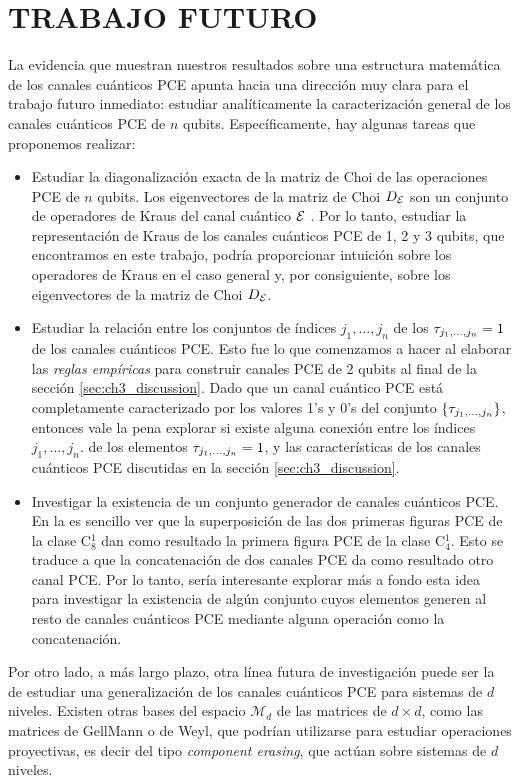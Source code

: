 \chapter{TRABAJO FUTURO}
La evidencia que muestran nuestros resultados sobre una estructura 
matemática de los canales cuánticos PCE apunta hacia una dirección 
muy clara para el trabajo futuro inmediato: estudiar analíticamente la caracterización 
general de los canales cuánticos PCE de $n$ qubits. Específicamente, hay algunas 
tareas que proponemos realizar:
\begin{itemize}
\item Estudiar la diagonalización exacta de la matriz de Choi de las operaciones 
PCE de $n$ qubits. Los eigenvectores de la matriz de Choi $D_{\mathcal{E}}$
son un conjunto de operadores de Kraus del canal cuántico $\mathcal{E}$ 
\cite{bengtsson_zyczkowski_2017}. Por lo tanto, 
estudiar la representación de Kraus de los canales cuánticos PCE de 1, 2 y 3 qubits,
que encontramos en este trabajo, podría proporcionar intuición 
sobre los operadores de Kraus en el caso general y, por consiguiente, 
sobre los eigenvectores de la matriz de Choi $D_{\mathcal{E}}$. 
\item Estudiar la relación entre los conjuntos de índices $j_1,\ldots,j_n$
de los $\tau_{j_1,\ldots ,j_n}=1$ de los canales cuánticos PCE. Esto fue lo que comenzamos 
a hacer al elaborar las \textit{reglas empíricas} para construir canales PCE de 2 qubits
al final de la sección \ref{sec:ch3_discussion}. Dado que un canal cuántico PCE 
está completamente caracterizado por los valores 1's y 0's del conjunto $\qty{\tau_{j_1,\ldots ,j_n}}$, 
entonces vale la pena explorar si existe alguna conexión entre los índices $j_1,\ldots,j_n$. de los 
elementos $\tau_{j_1,\ldots ,j_n}=1$, y las características de los canales 
cuánticos PCE discutidas en la sección \ref{sec:ch3_discussion}.
\item Investigar la existencia de un conjunto generador de canales cuánticos 
PCE. En la  es sencillo ver que la superposición
de las dos primeras figuras PCE de la clase C${}_8^1$ dan como resultado 
la primera figura PCE de la clase C${}_4^1$. Esto se traduce a que la 
concatenación de dos canales PCE da como resultado otro canal PCE. Por lo tanto,
sería interesante explorar más a fondo esta idea para investigar la existencia 
de algún conjunto cuyos elementos generen al resto de canales cuánticos PCE 
mediante alguna operación como la concatenación.
\end{itemize}
Por otro lado, a más largo plazo, otra línea futura de investigación puede ser 
la de estudiar una generalización de los canales cuánticos PCE para sistemas 
de $d$ niveles. Existen otras bases del espacio $\mathcal{M}_d$ de las matrices de 
$d\times d$, como las matrices de GellMann o de Weyl, 
que podrían utilizarse para estudiar operaciones proyectivas, es decir
del tipo \textit{component erasing}, que actúan sobre sistemas de $d$ niveles.
